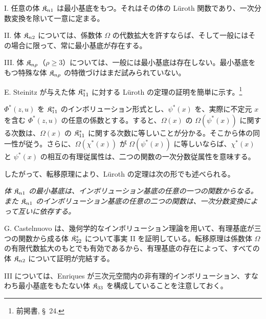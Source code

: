 \documentclass[11pt]{jlreq}
\begin{document}
I. 任意の体 $\mathfrak{K}_{n1}$ は最小基底をもつ。それはその体の Lüroth 関数であり、一次分数変換を除いて一意に定まる。

II. 体 $\mathfrak{K}_{n2}$ については、係数体 $\Omega$ の代数拡大を許すならば、そして一般にはその場合に限って、常に最小基底が存在する。

III. 体 $\mathfrak{K}_{n\rho}$（$\rho\ge3$）については、一般には最小基底は存在しない。最小基底をもつ特殊な体 $\mathfrak{K}_{n\rho}$ の特徴づけはまだ試みられていない。

E. Steinitz が与えた体 $\mathfrak{K}^*_{11}$ に対する Lüroth の定理の証明を簡単に示す。\footnote{前掲書, \S\ 24.}

$\Phi^*(z,u)$ を $\mathfrak{K}^*_{11}$ のインボリューション形式とし、$\psi^*(x)$ を、実際に不定元 $x$ を含む $\Phi^*(z,u)$ の任意の係数とする。すると、$\Omega(x)$ の $\Omega(\psi^*(x))$ に関する次数は、$\Omega(x)$ の $\mathfrak{K}^*_{11}$ に関する次数に等しいことが分かる。そこから体の同一性が従う。さらに、$\Omega(\chi^*(x))$ が $\Omega(\psi^*(x))$ に等しいならば、$\chi^*(x)$ と $\psi^*(x)$ の相互の有理従属性は、二つの関数の一次分数従属性を意味する。

したがって、転移原理により、Lüroth の定理は次の形でも述べられる。

\emph{体 $\mathfrak{K}_{n1}$ の最小基底は、インボリューション基底の任意の一つの関数からなる。また $\mathfrak{K}_{n1}$ のインボリューション基底の任意の二つの関数は、一次分数変換によって互いに依存する。}

G. Castelnuovo は、幾何学的なインボリューション理論を用いて、有理基底が三つの関数から成る体 $\mathfrak{K}^*_{22}$ について事実 II を証明している。転移原理は係数体 $\Omega$ の有限代数拡大のもとでも有効であるから、有理基底の存在によって、すべての体 $\mathfrak{K}_{n2}$ について証明が完結する。

III については、Enriques が三次元空間内の非有理的インボリューション、すなわち最小基底をもたない体 $\mathfrak{K}_{33}$ を構成していることを注意しておく。
\end{document}
